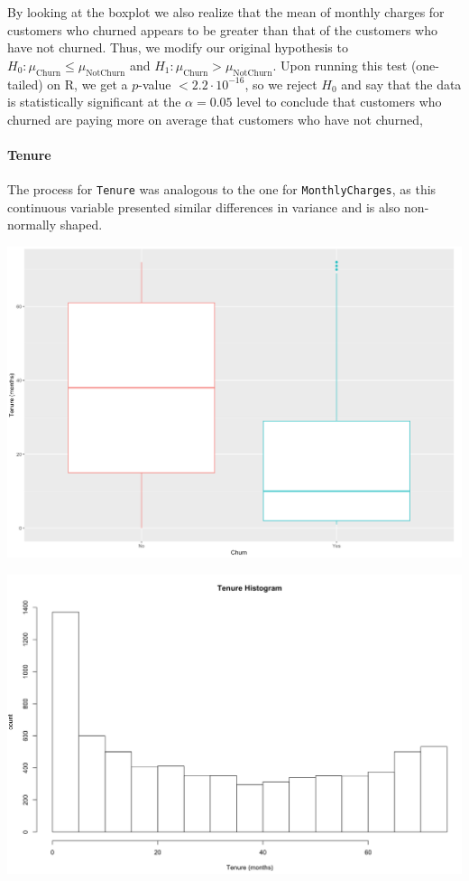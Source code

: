 \documentclass[man, floatsintext]{apa6}
\begin{document}
\hspace{0.5mm}

By looking at the boxplot we also realize that the mean of monthly charges for customers who churned appears to be greater than that of the customers who have not churned. Thus, we modify our original hypothesis to $H_0: \mu_{\text{Churn}} \leq \mu_{\text{NotChurn}}$ and $H_1: \mu_{\text{Churn}} > \mu_{\text{NotChurn}}$. Upon running this test (one-tailed) on R, we get a $p$-value $< 2.2 \cdot 10^{-16}$, so we reject $H_0$ and say that the data is statistically significant  at the $\alpha = 0.05$ level to conclude that customers who churned are paying more on average that customers who have not churned,
\paragraph{Tenure}

The process for \texttt{Tenure} was analogous to the one for \texttt{MonthlyCharges}, as this continuous variable presented similar differences in variance and is also non-normally shaped. 

\hspace{0.5mm}

\noindent\begin{minipage}{0.485\textwidth}
\includegraphics[width = \linewidth]{boxplot_tenurebyChurn}
\end{minipage}
\hfill
\begin{minipage}{0.5\textwidth} 
\includegraphics[width = \linewidth]{histogram_Tenure}
\end{minipage}
\end{document}
